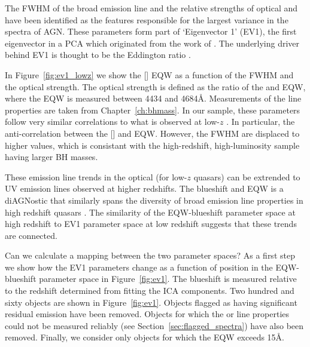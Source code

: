 The FWHM of the broad \hb emission line and the relative strengths of optical  and \hb have been identified as the features responsible for the largest variance in the spectra of AGN. 
These parameters form part of `Eigenvector 1' (EV1), the first eigenvector in a \ac{PCA} which originated from the work of \citet{boroson92}.   
The underlying driver behind EV1 is thought to be the Eddington ratio \citep[e.g.][]{sulentic00b,shen14}. 

In Figure~\ref{fig:ev1_lowz} we show the [] \ac{EQW} as a function of the \hb FWHM and the optical  strength. 
The optical  strength is defined as the ratio of the  and \hb \ac{EQW}, where the  \ac{EQW} is measured between 4434 and 4684\AA.
Measurements of the \hb line properties are taken from Chapter~\ref{ch:bhmass}. 
In our sample, these parameters follow very similar correlations to what is observed at low-$z$ \citep[see also][]{sulentic04, shen16a}.
In particular, the anti-correlation between the [] and  \ac{EQW}.  
However, the \hb FWHM are displaced to higher values, which is consistant with the high-redshift, high-luminosity sample having larger \ac{BH} masses. 

These emission line trends in the optical (for low-$z$ quasars) can be extrended to UV emission lines observed at higher redshifts. 
The  blueshift and \ac{EQW} is a di\ac{AGN}ostic that similarly spans the diversity of broad emission line properties in high redshift quasars \citep[dominated by a virialized component at one extreme and a wind driven component at the other][]{richards11,sulentic07}. 
The similarity of the  \ac{EQW}-blueshift parameter space at high redshift to \ac{EV1} parameter space at low redshift suggests that these trends are connected. 

Can we calculate a mapping between the two parameter spaces? 
As a first step we show how the \ac{EV1} parameters change as a function of position in the  \ac{EQW}-blueshift parameter space in Figure~\ref{fig:ev1}. 
The  blueshift is measured relative to the redshift determined from fitting the \ac{ICA} components.
Two hundred and sixty objects are shown in Figure~\ref{fig:ev1}.
Objects flagged as having significant  residual emission have been removed.  
Objects for which the \hb or  line properties could not be measured reliably (see Section~\ref{sec:flagged_spectra}) have also been removed. 
Finally, we consider only objects for which the  EQW exceeds 15\AA. 


